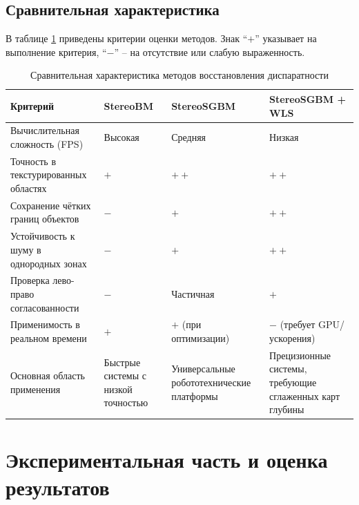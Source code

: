 	\subsection{Сравнительная характеристика}
	В таблице \ref{tab:comparison} приведены критерии оценки методов. Знак ``$+$'' указывает на выполнение критерия, ``$-$'' -- на отсутствие или слабую выраженность.
	
	\begin{table}[h]
		\centering
		\caption{Сравнительная характеристика методов восстановления диспаратности}
		\label{tab:comparison}
		\begin{tabular}{|p{3cm}|p{3cm}|p{3cm}|p{3cm}|}
			\hline
			\textbf{Критерий} & \textbf{StereoBM} & \textbf{StereoSGBM} & \textbf{StereoSGBM + WLS} \\ \hline
			Вычислительная сложность (FPS) & Высокая & Средняя & Низкая \\ \hline
			Точность в текстурированных областях & $+$ & $++$ & $++$ \\ \hline
			Сохранение чётких границ объектов & $-$ & $+$ & $++$ \\ \hline
			Устойчивость к шуму в однородных зонах & $-$ & $+$ & $++$ \\ \hline
			Проверка лево-право согласованности & $-$ & Частичная & $+$ \\ \hline
			Применимость в реальном времени & $+$ & $+$ (при оптимизации) & $-$ (требует GPU/ускорения) \\ \hline
			Основная область применения & Быстрые системы с низкой точностью & Универсальные робототехнические платформы & Прецизионные системы, требующие сглаженных карт глубины \\ \hline
		\end{tabular}
	\end{table}
	
	\section{Экспериментальная часть и оценка результатов}
